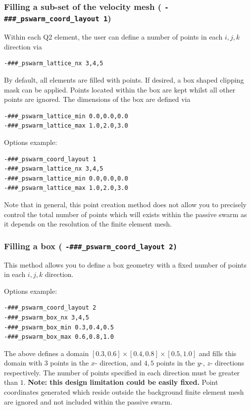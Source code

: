 \documentclass[paper=a4, fontsize=10pt,twoside]{scrartcl}
\begin{document}
{{\subsubsection{Filling a sub-set of the velocity mesh ( \texttt{-\#\#\#\_pswarm\_coord\_layout 1})}

Within each Q2 element, the user can define a number of points in each $i,j,k$ direction via
\begin{lstlisting}
-###_pswarm_lattice_nx 3,4,5
\end{lstlisting}

By default, all elements are filled with points.
If desired, a box shaped clipping mask can be applied. Points located within the box are kept
whilst all other points are ignored. The dimensions of the box are defined via
\begin{lstlisting}
-###_pswarm_lattice_min 0.0,0.0,0.0
-###_pswarm_lattice_max 1.0,2.0,3.0
\end{lstlisting}

Options example:
\begin{lstlisting}
-###_pswarm_coord_layout 1
-###_pswarm_lattice_nx 3,4,5
-###_pswarm_lattice_min 0.0,0.0,0.0
-###_pswarm_lattice_max 1.0,2.0,3.0
\end{lstlisting}

Note that in general, this point creation method does not allow you to precisely control the total number of points which
will exists within the passive swarm as it depends on the resolution of the finite element mesh.

\subsubsection{Filling a box ( \texttt{-\#\#\#\_pswarm\_coord\_layout 2)}}

This method allows you to define a box geometry with a fixed number of points in each $i,j,k$ direction.

Options example:
\begin{lstlisting}
-###_pswarm_coord_layout 2
-###_pswarm_box_nx 3,4,5
-###_pswarm_box_min 0.3,0.4,0.5
-###_pswarm_box_max 0.6,0.8,1.0
\end{lstlisting}

The above defines a domain $[0.3,0.6] \times [0.4,0.8] \times [0.5,1.0]$ and fills this domain with $3$ points in the $x$- direction, and $4,5$ points in the $y$-, $z$- directions respectively. The number of points specified in each direction must be greater than $1$. 
\textbf{Note: this design limitation could be easily fixed.} 
Point coordinates generated which reside outside the background finite element mesh are ignored and not included within the passive swarm.

}}
\end{document}
